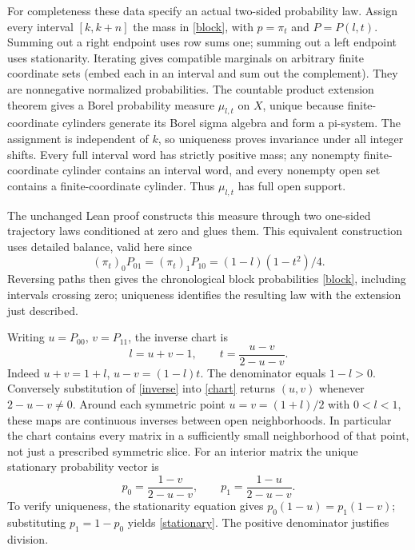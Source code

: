 \documentclass[11pt]{article}
\begin{document}
For completeness these data specify an actual two-sided probability law. Assign every interval $[k,k+n]$ the mass in \eqref{block}, with $p=\pi_t$ and $P=P(l,t)$. Summing out a right endpoint uses row sums one; summing out a left endpoint uses stationarity. Iterating gives compatible marginals on arbitrary finite coordinate sets (embed each in an interval and sum out the complement). They are nonnegative normalized probabilities. The countable product extension theorem gives a Borel probability measure $\mu_{l,t}$ on $X$, unique because finite-coordinate cylinders generate its Borel sigma algebra and form a pi-system. The assignment is independent of $k$, so uniqueness proves invariance under all integer shifts. Every full interval word has strictly positive mass; any nonempty finite-coordinate cylinder contains an interval word, and every nonempty open set contains a finite-coordinate cylinder. Thus $\mu_{l,t}$ has full open support.

The unchanged Lean proof constructs this measure through two one-sided trajectory laws conditioned at zero and glues them. This equivalent construction uses detailed balance, valid here since
\[
 (\pi_t)_0P_{01}=(\pi_t)_1P_{10}=(1-l)(1-t^2)/4.
\]
Reversing paths then gives the chronological block probabilities \eqref{block}, including intervals crossing zero; uniqueness identifies the resulting law with the extension just described.

Writing $u=P_{00}$, $v=P_{11}$, the inverse chart is
\begin{equation}
 l=u+v-1,\qquad t=\frac{u-v}{2-u-v}.\label{inverse}
\end{equation}
Indeed $u+v=1+l$, $u-v=(1-l)t$. The denominator equals $1-l>0$. Conversely substitution of \eqref{inverse} into \eqref{chart} returns $(u,v)$ whenever $2-u-v\ne0$. Around each symmetric point $u=v=(1+l)/2$ with $0<l<1$, these maps are continuous inverses between open neighborhoods. In particular the chart contains every matrix in a sufficiently small neighborhood of that point, not just a prescribed symmetric slice. For an interior matrix the unique stationary probability vector is
\begin{equation}
 p_0=\frac{1-v}{2-u-v},\qquad p_1=\frac{1-u}{2-u-v}.\label{stationary}
\end{equation}
To verify uniqueness, the stationarity equation gives $p_0(1-u)=p_1(1-v)$; substituting $p_1=1-p_0$ yields \eqref{stationary}. The positive denominator justifies division.
\end{document}
